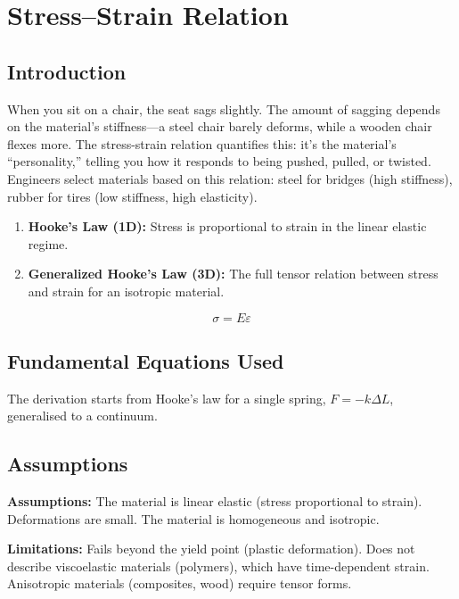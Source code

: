 \chapter{Stress--Strain Relation}

\section*{Introduction}

When you sit on a chair, the seat sags slightly. The amount of sagging depends on the material's stiffness---a steel chair barely deforms, while a wooden chair flexes more. The stress-strain relation quantifies this: it's the material's ``personality,'' telling you how it responds to being pushed, pulled, or twisted. Engineers select materials based on this relation: steel for bridges (high stiffness), rubber for tires (low stiffness, high elasticity).

\begin{enumerate}
\item \textbf{Hooke's Law (1D):} Stress is proportional to strain in the linear elastic regime.

\item \textbf{Generalized Hooke's Law (3D):} The full tensor relation between stress and strain for an isotropic material.

\end{enumerate}


\[
\sigma = E\varepsilon
\]

\section*{Fundamental Equations Used}

The derivation starts from Hooke's law for a single spring, $F = -k\Delta L$, generalised to a continuum.

\section*{Assumptions}

\textbf{Assumptions:} The material is linear elastic (stress proportional to strain). Deformations are small. The material is homogeneous and isotropic.


\textbf{Limitations:} Fails beyond the yield point (plastic deformation). Does not describe viscoelastic materials (polymers), which have time-dependent strain. Anisotropic materials (composites, wood) require tensor forms.


